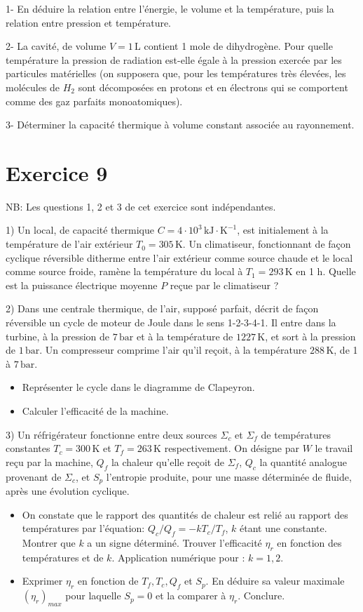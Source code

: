 \documentclass[a4paper,12pt]{article}
\begin{document}
	1- En déduire la relation entre l'énergie, le volume et la température, puis la relation entre pression et température.
	
	2- La cavité, de volume $V = 1\,\text{L}$ contient 1 mole de dihydrogène. Pour quelle température la pression de radiation est-elle égale à la pression exercée par les particules matérielles (on supposera que, pour les températures très élevées, les molécules de $H_2$ sont décomposées en protons et en électrons qui se comportent comme des gaz parfaits monoatomiques).
	
	3- Déterminer la capacité thermique à volume constant associée au rayonnement.
	
	\section*{Exercice 9}
	NB: Les questions 1, 2 et 3 de cet exercice sont indépendantes.
	
	1) Un local, de capacité thermique $C = 4\cdot10^3\,\text{kJ}\cdot\text{K}^{-1}$, est initialement à la température de l'air extérieur $T_0 = 305\,\text{K}$. Un climatiseur, fonctionnant de façon cyclique réversible ditherme entre l'air extérieur comme source chaude et le local comme source froide, ramène la température du local à $T_1 = 293\,\text{K}$ en 1 h. Quelle est la puissance électrique moyenne $P$ reçue par le climatiseur ?
	
	2) Dans une centrale thermique, de l'air, supposé parfait, décrit de façon réversible un cycle de moteur de Joule dans le sens 1-2-3-4-1. Il entre dans la turbine, à la pression de $7\,\text{bar}$ et à la température de $1227\,\text{K}$, et sort à la pression de $1\,\text{bar}$. Un compresseur comprime l'air qu'il reçoit, à la température $288\,\text{K}$, de 1 à $7\,\text{bar}$.
	\begin{itemize}
		\item[a)] Représenter le cycle dans le diagramme de Clapeyron.
		\item[b)] Calculer l'efficacité de la machine.
	\end{itemize}
	
	3) Un réfrigérateur fonctionne entre deux sources $\Sigma_c$ et $\Sigma_f$ de températures constantes $T_c = 300\,\text{K}$ et $T_f = 263\,\text{K}$ respectivement. On désigne par $W$ le travail reçu par la machine, $Q_f$ la chaleur qu'elle reçoit de $\Sigma_f$, $Q_c$ la quantité analogue provenant de $\Sigma_c$, et $S_p$ l'entropie produite, pour une masse déterminée de fluide, après une évolution cyclique.
	\begin{itemize}
		\item[a)] On constate que le rapport des quantités de chaleur est relié au rapport des températures par l'équation: $Q_c/Q_f = -k T_c/T_f$, $k$ étant une constante. Montrer que $k$ a un signe déterminé. Trouver l'efficacité $\eta_r$ en fonction des températures et de $k$. Application numérique pour : $k=1,2$.
		\item[b)] Exprimer $\eta_r$ en fonction de $T_f, T_c, Q_f$ et $S_p$. En déduire sa valeur maximale $(\eta_r)_{max}$ pour laquelle $S_p = 0$ et la comparer à $\eta_r$. Conclure.
	\end{itemize}
	
\end{document}
